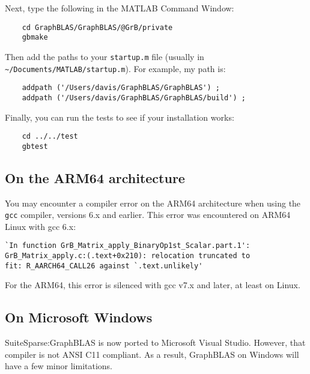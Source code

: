 \documentclass[12pt]{article}
\begin{document}
Next, type the following in the MATLAB Command Window:

    {\small
    \begin{verbatim}
    cd GraphBLAS/GraphBLAS/@GrB/private
    gbmake \end{verbatim} }

Then add the paths to your \verb'startup.m' file (usually in
\verb'~/Documents/MATLAB/startup.m').  For example, my path is:

    {\small
    \begin{verbatim}
    addpath ('/Users/davis/GraphBLAS/GraphBLAS') ;
    addpath ('/Users/davis/GraphBLAS/GraphBLAS/build') ; \end{verbatim} }

Finally, you can run the tests to see if your installation works:

    {\small
    \begin{verbatim}
    cd ../../test
    gbtest \end{verbatim} }

\subsection{On the ARM64 architecture}

You may encounter a compiler error on the ARM64 architecture when using the
\verb'gcc' compiler, versions 6.x and earlier.  This error was encountered on
ARM64 Linux with gcc 6.x:

\begin{verbatim}
`In function GrB_Matrix_apply_BinaryOp1st_Scalar.part.1':
GrB_Matrix_apply.c:(.text+0x210): relocation truncated to
fit: R_AARCH64_CALL26 against `.text.unlikely'
\end{verbatim}

For the ARM64, this error is silenced with gcc v7.x and later, at least on
Linux.

\subsection{On Microsoft Windows}
\label{sec:windows}

SuiteSparse:GraphBLAS is now ported to Microsoft Visual Studio.  However, that
compiler is not ANSI C11 compliant. As a result, GraphBLAS on Windows will have
a few minor limitations.
\end{document}
